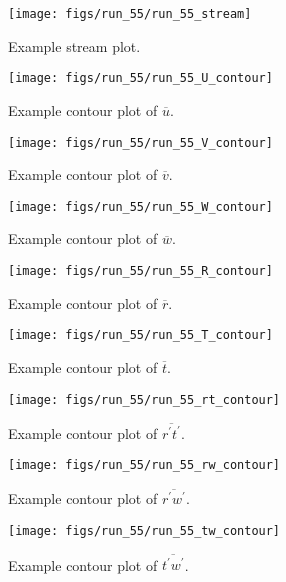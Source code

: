 {\begin{figure}[H]
	\centering
	\texttt{[image: figs/run\_55/run\_55\_stream]}
	\caption{Example stream plot.}
	\label{fig:examp_stream}
\end{figure}

\begin{figure}[H]
	\centering
	\texttt{[image: figs/run\_55/run\_55\_U\_contour]}
\caption{Example contour plot of $\overline{u}$.}
\label{fig:examp_U}
\end{figure}

\begin{figure}[H]
	\centering
	\texttt{[image: figs/run\_55/run\_55\_V\_contour]}
\caption{Example contour plot of $\overline{v}$.}
\label{fig:examp_V}
\end{figure}

\begin{figure}[H]
	\centering
	\texttt{[image: figs/run\_55/run\_55\_W\_contour]}
\caption{Example contour plot of $\overline{w}$.}
\label{fig:examp_W}
\end{figure}

\begin{figure}[H]
	\centering
	\texttt{[image: figs/run\_55/run\_55\_R\_contour]}
\caption{Example contour plot of $\overline{r}$.}
\label{fig:examp_R}
\end{figure}

\begin{figure}[H]
	\centering
	\texttt{[image: figs/run\_55/run\_55\_T\_contour]}
\caption{Example contour plot of $\overline{t}$.}
\label{fig:examp_T}
\end{figure}

\begin{figure}[H]
	\centering
	\texttt{[image: figs/run\_55/run\_55\_rt\_contour]}
\caption{Example contour plot of $\overline{r^\prime t^\prime}$.}
\label{fig:examp_rt}
\end{figure}

\begin{figure}[H]
	\centering
	\texttt{[image: figs/run\_55/run\_55\_rw\_contour]}
\caption{Example contour plot of $\overline{r^\prime w^\prime}$.}
\label{fig:examp_rw}
\end{figure}

\begin{figure}[H]
	\centering
	\texttt{[image: figs/run\_55/run\_55\_tw\_contour]}
\caption{Example contour plot of $\overline{t^\prime w^\prime}$.}
\label{fig:examp_tw}
\end{figure}

}
